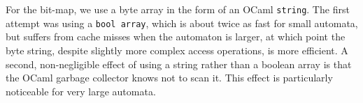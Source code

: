 For the bit-map, we use a byte array in the form of an OCaml \texttt{string}.
The first attempt was using a \texttt{bool array}, which is about twice as fast
for small automata, but suffers from cache misses when the automaton is larger,
at which point the byte string, despite slightly more complex access operations,
is more efficient. A second, non-negligible effect of using a string rather than
a boolean array is that the OCaml garbage collector knows not to scan it. This
effect is particularly noticeable for very large automata.



